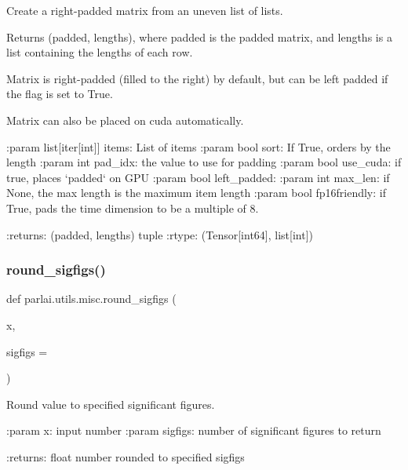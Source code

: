 \begin{DoxyVerb}Create a right-padded matrix from an uneven list of lists.

Returns (padded, lengths), where padded is the padded matrix, and lengths
is a list containing the lengths of each row.

Matrix is right-padded (filled to the right) by default, but can be
left padded if the flag is set to True.

Matrix can also be placed on cuda automatically.

:param list[iter[int]] items: List of items
:param bool sort: If True, orders by the length
:param int pad_idx: the value to use for padding
:param bool use_cuda: if true, places `padded` on GPU
:param bool left_padded:
:param int max_len: if None, the max length is the maximum item length
:param bool fp16friendly: if True, pads the time dimension to be a multiple of 8.

:returns: (padded, lengths) tuple
:rtype: (Tensor[int64], list[int])
\end{DoxyVerb}
 \mbox{\label{namespaceparlai_1_1utils_1_1misc_af245c261b10f36175f6d88fce852c552}} 
\subsubsection{\texorpdfstring{round\+\_\+sigfigs()}{round\_sigfigs()}}
{\footnotesize\ttfamily def parlai.\+utils.\+misc.\+round\+\_\+sigfigs (\begin{DoxyParamCaption}\item[{}]{x,  }\item[{}]{sigfigs = {} }\end{DoxyParamCaption})}

\begin{DoxyVerb}Round value to specified significant figures.

:param x: input number
:param sigfigs: number of significant figures to return

:returns: float number rounded to specified sigfigs
\end{DoxyVerb}
 \mbox{\label{namespaceparlai_1_1utils_1_1misc_a8781cc03272b3a118fcd9e5a9f4ca1dd}} 
